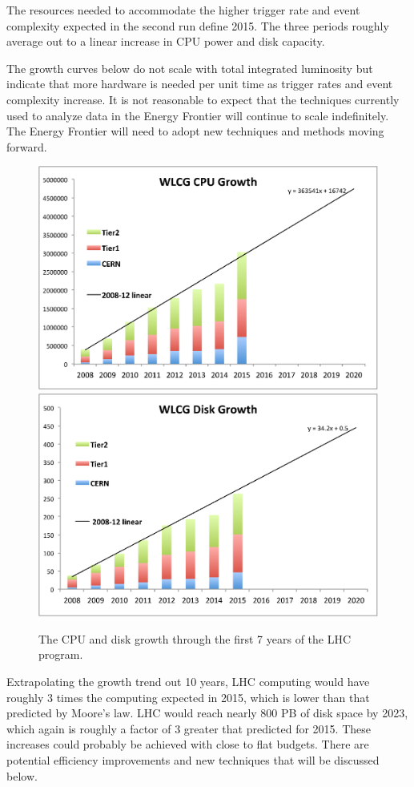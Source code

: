The resources needed to accommodate
the higher trigger rate and event complexity expected in the second run define
2015.  The three periods roughly average out to a linear increase in
CPU power and disk capacity.

The growth curves below do not scale with total integrated luminosity but
indicate that more hardware is needed per unit time as trigger rates and event
complexity increase. It is not reasonable to expect that the techniques
currently used to analyze data in the Energy Frontier will continue to scale indefinitely.
The Energy Frontier will need to adopt new techniques and methods moving forward.

\begin{figure}[htb]
\begin{center}
\includegraphics[width=0.45\hsize]{CpF-E2/Growth1.eps}
\includegraphics[width=0.45\hsize]{CpF-E2/Growth2.eps}
\caption{The CPU and disk growth through the first 7 years of the LHC program.}
\label{fig:growth}
\end{center}
\end{figure}


Extrapolating the growth trend out 10 years,  LHC computing would have
roughly 3 times the computing expected in 2015, which is lower than that
predicted by Moore's law.  LHC would reach nearly 800 PB of disk 
space by
2023, which again is roughly a factor of 3 greater that predicted for
2015.   These increases could
probably be achieved with close to flat budgets.   There are potential
efficiency improvements and new techniques that will be discussed below.

